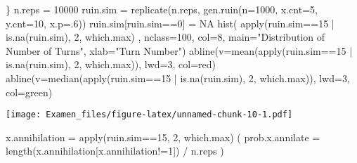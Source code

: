 \documentclass[
]{article}
\newenvironment{Shaded}{\begin{snugshade}}{\end{snugshade}}
\newcommand{\AttributeTok}[1]{\textcolor[rgb]{0.77,0.63,0.00}{#1}}
\newcommand{\ConstantTok}[1]{\textcolor[rgb]{0.00,0.00,0.00}{#1}}
\newcommand{\DecValTok}[1]{\textcolor[rgb]{0.00,0.00,0.81}{#1}}
\newcommand{\FunctionTok}[1]{\textcolor[rgb]{0.00,0.00,0.00}{#1}}
\newcommand{\NormalTok}[1]{#1}
\newcommand{\OtherTok}[1]{\textcolor[rgb]{0.56,0.35,0.01}{#1}}
\newcommand{\SpecialCharTok}[1]{\textcolor[rgb]{0.00,0.00,0.00}{#1}}
\newcommand{\StringTok}[1]{\textcolor[rgb]{0.31,0.60,0.02}{#1}}
\begin{document}
\begin{Shaded}
\begin{Highlighting}[]
\NormalTok{  \}}
\NormalTok{n.reps }\OtherTok{=} \DecValTok{10000}
\NormalTok{ruin.sim }\OtherTok{=} \FunctionTok{replicate}\NormalTok{(n.reps, }\FunctionTok{gen.ruin}\NormalTok{(}\AttributeTok{n=}\DecValTok{1000}\NormalTok{, }\AttributeTok{x.cnt=}\DecValTok{5}\NormalTok{, }\AttributeTok{y.cnt=}\DecValTok{10}\NormalTok{, }\AttributeTok{x.p=}\NormalTok{.}\DecValTok{6}\NormalTok{))}
\NormalTok{ruin.sim[ruin.sim}\SpecialCharTok{==}\DecValTok{0}\NormalTok{] }\OtherTok{=} \ConstantTok{NA}
\FunctionTok{hist}\NormalTok{( }\FunctionTok{apply}\NormalTok{(ruin.sim}\SpecialCharTok{==}\DecValTok{15} \SpecialCharTok{|} \FunctionTok{is.na}\NormalTok{(ruin.sim), }\DecValTok{2}\NormalTok{, which.max) , }\AttributeTok{nclass=}\DecValTok{100}\NormalTok{, }\AttributeTok{col=}\StringTok{\textquotesingle{}8\textquotesingle{}}\NormalTok{, }\AttributeTok{main=}\StringTok{"Distribution of Number of Turns"}\NormalTok{,}
\AttributeTok{xlab=}\StringTok{"Turn Number"}\NormalTok{)}
\FunctionTok{abline}\NormalTok{(}\AttributeTok{v=}\FunctionTok{mean}\NormalTok{(}\FunctionTok{apply}\NormalTok{(ruin.sim}\SpecialCharTok{==}\DecValTok{15} \SpecialCharTok{|} \FunctionTok{is.na}\NormalTok{(ruin.sim), }\DecValTok{2}\NormalTok{, which.max)), }\AttributeTok{lwd=}\DecValTok{3}\NormalTok{, }\AttributeTok{col=}\StringTok{\textquotesingle{}red\textquotesingle{}}\NormalTok{)}
\FunctionTok{abline}\NormalTok{(}\AttributeTok{v=}\FunctionTok{median}\NormalTok{(}\FunctionTok{apply}\NormalTok{(ruin.sim}\SpecialCharTok{==}\DecValTok{15} \SpecialCharTok{|} \FunctionTok{is.na}\NormalTok{(ruin.sim), }\DecValTok{2}\NormalTok{, which.max)), }\AttributeTok{lwd=}\DecValTok{3}\NormalTok{, }\AttributeTok{col=}\StringTok{\textquotesingle{}green\textquotesingle{}}\NormalTok{)}
\end{Highlighting}
\end{Shaded}

\texttt{[image: Examen\_files/figure-latex/unnamed-chunk-10-1.pdf]}

\begin{Shaded}
\begin{Highlighting}[]
\NormalTok{x.annihilation }\OtherTok{=} \FunctionTok{apply}\NormalTok{(ruin.sim}\SpecialCharTok{==}\DecValTok{15}\NormalTok{, }\DecValTok{2}\NormalTok{, which.max)}
\NormalTok{( }\AttributeTok{prob.x.annilate =} \FunctionTok{length}\NormalTok{(x.annihilation[x.annihilation}\SpecialCharTok{!=}\DecValTok{1}\NormalTok{]) }\SpecialCharTok{/}\NormalTok{ n.reps )}
\end{Highlighting}
\end{Shaded}
\end{document}
